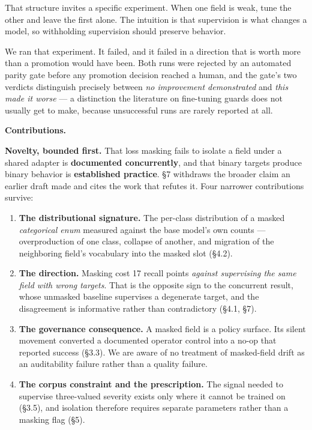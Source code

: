 \documentclass[10pt]{article}
\providecommand{\tightlist}{\setlength{\itemsep}{0pt}\setlength{\parskip}{0pt}}
\begin{document}
That structure invites a specific experiment. When one field is weak, tune the other and leave the
first alone. The intuition is that supervision is what changes a model, so withholding supervision
should preserve behavior.

We ran that experiment. It failed, and it failed in a direction that is worth more than a promotion
would have been. Both runs were rejected by an automated parity gate before any promotion decision
reached a human, and the gate's two verdicts distinguish precisely between \emph{no improvement
demonstrated} and \emph{this made it worse} --- a distinction the literature on fine-tuning guards does not
usually get to make, because unsuccessful runs are rarely reported at all.

\textbf{Contributions.}

\textbf{Novelty, bounded first.} That loss masking fails to isolate a field under a shared adapter is
\textbf{documented concurrently}, and that binary targets produce binary behavior is \textbf{established
practice}. §7 withdraws the broader claim an earlier draft made and cites the work that refutes it.
Four narrower contributions survive:

\begin{enumerate}
\def\labelenumi{\arabic{enumi}.}
\tightlist
\item
  \textbf{The distributional signature.} The per-class distribution of a masked \emph{categorical enum}
  measured against the base model's own counts --- overproduction of one class, collapse of another,
  and migration of the neighboring field's vocabulary into the masked slot (§4.2).
\item
  \textbf{The direction.} Masking cost 17 recall points \emph{against supervising the same field with wrong
  targets}. That is the opposite sign to the concurrent result, whose unmasked baseline supervises a
  degenerate target, and the disagreement is informative rather than contradictory (§4.1, §7).
\item
  \textbf{The governance consequence.} A masked field is a policy surface. Its silent movement converted
  a documented operator control into a no-op that reported success (§3.3). We are aware of no
  treatment of masked-field drift as an auditability failure rather than a quality failure.
\item
  \textbf{The corpus constraint and the prescription.} The signal needed to supervise three-valued
  severity exists only where it cannot be trained on (§3.5), and isolation therefore requires
  separate parameters rather than a masking flag (§5).
\end{enumerate}
\end{document}
